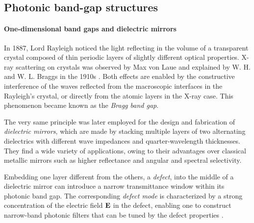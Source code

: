 

\subsection{Photonic band-gap structures} 
\paragraph{One-dimensional band gaps and dielectric mirrors}%
In 1887, Lord Rayleigh \cite{johnson2003introduction} noticed the light reflecting in the volume of a transparent crystal composed of thin periodic layers of slightly different optical properties. X-ray scattering on crystals was observed by Max von Laue \cite{friedrich1913interferenzerscheinungen} and explained by W. H. and W. L. Braggs in the 1910s \cite{bragg1913reflection}. 
Both effects are enabled by the constructive interference of the waves reflected from the macroscopic interfaces in the Rayleigh's crystal, or directly from the atomic layers in the X-ray case. This phenomenon became known as the \textit{Bragg band gap}.

The very same principle was later %
employed for the design and fabrication of \textit{dielectric mirrors}, which are made by stacking multiple layers of two alternating dielectrics with different wave impedances and quarter-wavelength thicknesses. They find a wide variety of applications, owing to their advantages over classical metallic mirrors such as higher reflectance and angular and spectral selectivity.  %

Embedding one layer different from the others, a \textit{defect}, into the middle of a dielectric mirror can introduce a narrow transmittance window within its photonic band gap. The corresponding \textit{defect mode} is characterized by a strong concentration of the electric field $\mathbf{E}$ in the defect, enabling one to construct narrow-band photonic filters that can be tuned by the defect properties \cite{nemec2005highly}.


